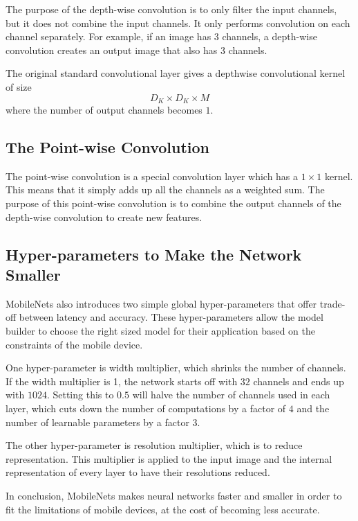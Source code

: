 \documentclass[11pt]{amsart}
\begin{document}
The purpose of the depth-wise convolution is to only filter the input channels, but it does not combine the input channels. It only performs convolution on each channel separately. For example, if an image has 3 channels, a depth-wise convolution creates an output image that also has 3 channels.

The original standard convolutional layer gives a depthwise convolutional kernel of size\[
D_K\times D_K\times M
\]where the number of output channels becomes $1$.

\subsection{The Point-wise Convolution}
The point-wise convolution is a special convolution layer which has a $1\times1$ kernel. This means that it simply adds up all the channels as a weighted sum. The purpose of this point-wise convolution is to combine the output channels of the depth-wise convolution to create new features.

\subsection{Hyper-parameters to Make the Network Smaller}
MobileNets also introduces two simple global hyper-parameters that offer trade-off between latency and accuracy. These hyper-parameters allow the model builder to choose the right sized model for their application based on the constraints of the mobile device.

One hyper-parameter is width multiplier, which shrinks the number of channels. If the width multiplier is 1, the network starts off with $32$ channels and ends up with $1024$. Setting this to $0.5$ will halve the number of channels used in each layer, which cuts down the number of computations by a factor of $4$ and the number of learnable parameters by a factor $3$.

The other hyper-parameter is resolution multiplier, which is to reduce representation. This multiplier is applied to the input image and the internal representation of every layer to have their resolutions reduced.

In conclusion, MobileNets makes neural networks faster and smaller in order to fit the limitations of mobile devices, at the cost of becoming less accurate.



\end{document}
